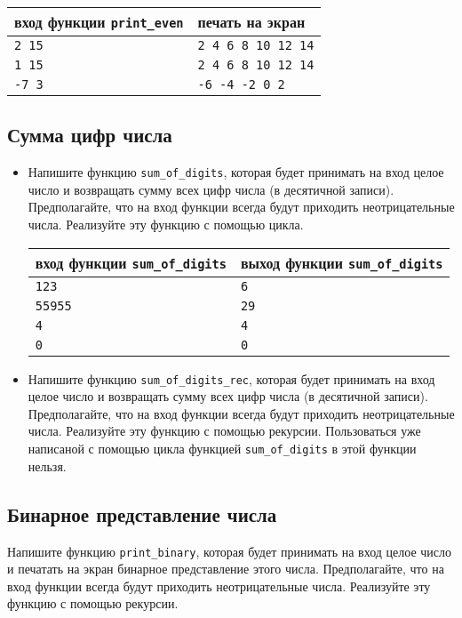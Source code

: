 \documentclass{article}
\begin{document}
\begin{center}
\begin{tabular}{ l | l }
 вход функции \texttt{print\_even} & печать на экран \\ \hline
 \texttt{2 15} & \texttt{2 4 6 8 10 12 14}  \\
 \texttt{1 15} & \texttt{2 4 6 8 10 12 14}  \\  
 \texttt{-7 3} & \texttt{-6 -4 -2 0 2}  \\
\end{tabular}
\end{center}

\newpage


\subsection{Сумма цифр числа}
\begin{itemize}
\item Напишите функцию \texttt{sum\_of\_digits}, которая будет принимать на вход целое число и возвращать сумму всех цифр числа (в десятичной записи). Предполагайте, что на вход функции всегда будут приходить неотрицательные числа. Реализуйте эту функцию с помощью цикла.

\begin{center}
\begin{tabular}{ l | l }
 вход функции \texttt{sum\_of\_digits} & выход функции \texttt{sum\_of\_digits} \\ \hline
 \texttt{123} & \texttt{6}  \\
 \texttt{55955} & \texttt{29}  \\  
 \texttt{4} & \texttt{4}  \\
 \texttt{0} & \texttt{0}  \\
\end{tabular}
\end{center}

\item Напишите функцию \texttt{sum\_of\_digits\_rec}, которая будет принимать на вход целое число и возвращать сумму всех цифр числа (в десятичной записи). Предполагайте, что на вход функции всегда будут приходить неотрицательные числа. Реализуйте эту функцию с помощью рекурсии. Пользоваться уже написаной с помощью цикла функцией \texttt{sum\_of\_digits} в этой функции нельзя.
 \end{itemize}
 
 
\subsection{Бинарное представление числа}
Напишите функцию \texttt{print\_binary}, которая будет принимать на вход целое число и печатать на экран бинарное представление этого числа. Предполагайте, что на вход функции всегда будут приходить неотрицательные числа.
Реализуйте эту функцию с помощью рекурсии.
 
\end{document}
